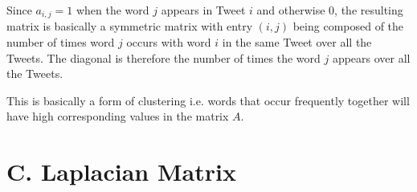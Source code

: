 \documentclass[11pt,a4paper]{article}
\begin{document}
Since $a_{i, j} = 1$ when the word $j$ appears in Tweet $i$ and otherwise 0, the resulting matrix is basically a symmetric matrix with entry $(i, j)$ being composed of the number of times word $j$ occurs with word $i$ in the same Tweet over all the Tweets. The diagonal is  therefore the number of times the word $j$ appears over all the Tweets.

This is basically a form of clustering i.e. words that occur frequently together will have high corresponding values in the matrix $A$.  

\section*{C. Laplacian Matrix}
\end{document}
